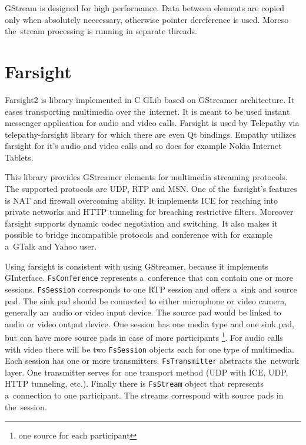 GStream is designed for high performance. Data between elements are copied only when absolutely neccessary, otherwise pointer dereference is used. Moreso the~stream processing is running in separate threads.  

\section{Farsight}
Farsight2 \cite{farsight} is library implemented in C GLib based on GStreamer architecture. It eases transporting multimedia over the~internet. It is meant to be used instant messenger application for audio and video calls. Farsight is used by Telepathy via telepathy-farsight library for which there are even Qt bindings. Empathy utilizes farsight for it's audio and video calls and so does for example Nokia Internet Tablets.

This library provides GStreamer elements for multimedia streaming protocols. The supported protocols are UDP, RTP and MSN. One of the~farsight's features is NAT and firewall overcoming ability. It implements ICE for reaching into private networks and HTTP tunneling for breaching restrictive filters. Moreover farsight supports dynamic codec negotiation and switching. It also makes it possible to bridge incompatible protocols and conference with for example a~GTalk and Yahoo user. 

Using farsight is consistent with using GStreamer, because it implements GInterface. \verb|FsConference| represents a~conference that can contain one or more sessions. \verb|FsSession| corresponds to one RTP session and offers a~sink and source pad. The sink pad should be connected to either microphone or video camera, generally an~audio or video input device. The source pad would be linked to audio or video output device. One session has one media type and one sink pad, but can have more source pads in case of more participants \footnote{one source for each participant}. For audio calls with video there will be two \verb|FsSession| objects each for one type of multimedia. Each session has one or more transmitters. \verb|FsTransmitter| abstracts the~network layer. One transmitter serves for one transport method (UDP with ICE, UDP, HTTP tunneling, etc.). Finally there is \verb|FsStream| object that represents a~connection to one participant. The streams correspond with source pads in the~session.

